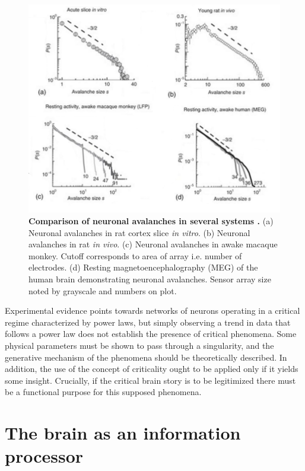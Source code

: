 \documentclass[12pt]{article}
\begin{document}
\begin{figure}      
  \begin{center}    
 \includegraphics[width=1\textwidth]{avalanchesplenzbook3}    
    \caption{\textbf{Comparison of neuronal avalanches in several systems \cite{Plenz2014}.} (a) Neuronal avalanches in rat cortex slice \textit{in vitro}. (b) Neuronal avalanches in rat \textit{in vivo}. (c) Neuronal avalanches in awake macaque monkey. Cutoff corresponds to area of array i.e. number of electrodes. (d) Resting magnetoencephalography (MEG) of the human brain demonstrating neuronal avalanches. Sensor array size noted by grayscale and numbers on plot.}
   \label{Figure::Neuronal avalanches in vitro and in vivo}   
  \end{center}     
   \end{figure}

Experimental evidence points towards networks of neurons operating in a critical regime characterized by power laws, but simply observing a trend in data that follows a power law does not establish the presence of critical phenomena. Some physical parameters must be shown to pass through a singularity, and the generative mechanism of the phenomena should be theoretically described. In addition, the use of the concept of criticality ought to be applied only if it yields some insight. Crucially, if the critical brain story is to be legitimized there must be a functional purpose for this supposed phenomena. 
      
\section*{The brain as an information processor}
\end{document}
